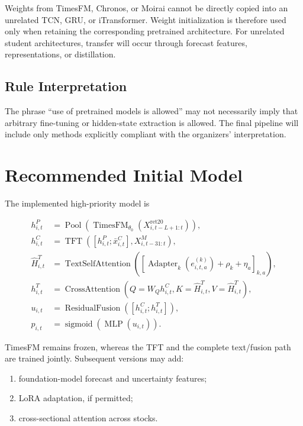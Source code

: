 \documentclass[11pt]{article}
\newcommand{\sigmoid}{\operatorname{sigmoid}}
\begin{document}
Weights from TimesFM, Chronos, or Moirai cannot be directly copied into an
unrelated TCN, GRU, or iTransformer. Weight initialization is therefore used
only when retaining the corresponding pretrained architecture. For unrelated
student architectures, transfer will occur through forecast features,
representations, or distillation.

\subsection{Rule Interpretation}

The phrase ``use of pretrained models is allowed'' may not necessarily imply
that arbitrary fine-tuning or hidden-state extraction is allowed. The final
pipeline will include only methods explicitly compliant with the organizers'
interpretation.

\section{Recommended Initial Model}

The implemented high-priority model is

\begin{equation}
\boxed{
\begin{aligned}
h^P_{i,t}
&=
\operatorname{Pool}\!\left(
\operatorname{TimesFM}_{\theta_0}
(X^{\mathrm{ret20}}_{i,t-L+1:t})
\right),\\
h^C_{i,t}
&=
\operatorname{TFT}
\left([h^P_{i,t};\bar x^C_{i,t}],X^M_{i,t-31:t}\right),\\
\widehat H^T_{i,t}
&=
\operatorname{TextSelfAttention}
\left(
\left[\operatorname{Adapter}_k(e^{(k)}_{i,t,a})
+\rho_k+\eta_a\right]_{k,a}
\right),\\
h^T_{i,t}
&=
\operatorname{CrossAttention}
\left(
Q=W_Qh^C_{i,t},
K=\widehat H^T_{i,t},
V=\widehat H^T_{i,t}
\right),\\
u_{i,t}
&=
\operatorname{ResidualFusion}
\left(
[h^C_{i,t};h^T_{i,t}]
\right),\\
p_{i,t}
&=
\sigmoid
\left(
\operatorname{MLP}(u_{i,t})
\right).
\end{aligned}
}
\end{equation}

TimesFM remains frozen, whereas the TFT and the complete text/fusion path are
trained jointly. Subsequent versions may add:

\begin{enumerate}
    \item foundation-model forecast and uncertainty features;
    \item LoRA adaptation, if permitted;
    \item cross-sectional attention across stocks.
\end{enumerate}
\end{document}
